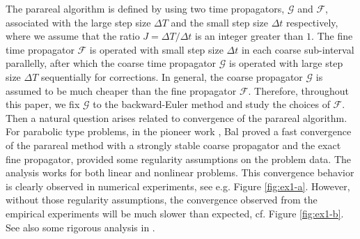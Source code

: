 The parareal algorithm is defined by
using two time propagators, $\mathcal{G}$ and $\mathcal{F}$,  associated with the large step size $\Delta T$ and the small step size $\Delta t$ respectively, where we assume that the ratio $J = \Delta T/\Delta t$ is an integer greater than $1$. The fine time propagator $\mathcal{F}$ is operated with small step size $\Delta t$ in each coarse sub-interval parallelly, after which the coarse time propagator $\mathcal{G}$ is operated with
large step size $\Delta T$ sequentially for corrections. 
In general, the coarse propagator  $\mathcal{G}$  is assumed to be much cheaper than the fine propagator $\mathcal{F}$.
Therefore, throughout this paper, we fix $\mathcal{G}$ to the backward-Euler method and study the choices of $\mathcal{F}$.
Then a natural question arises related to convergence of the parareal algorithm.
For parabolic type problems,
in the pioneer work \cite{Bal:2005}, Bal proved a fast convergence of the parareal method with a strongly stable coarse propagator
and the exact fine propagator,
provided some regularity assumptions on the problem data. The analysis works for both linear and nonlinear problems.
This convergence behavior
is clearly observed in numerical experiments,
see e.g. Figure \ref{fig:ex1-a}.
However, without those regularity assumptions,
the convergence observed from
the empirical experiments will be much slower than expected,
cf. Figure \ref{fig:ex1-b}.
See also some rigorous analysis in
\cite{MR3716570, MR3948240, MR4242247}.

%



